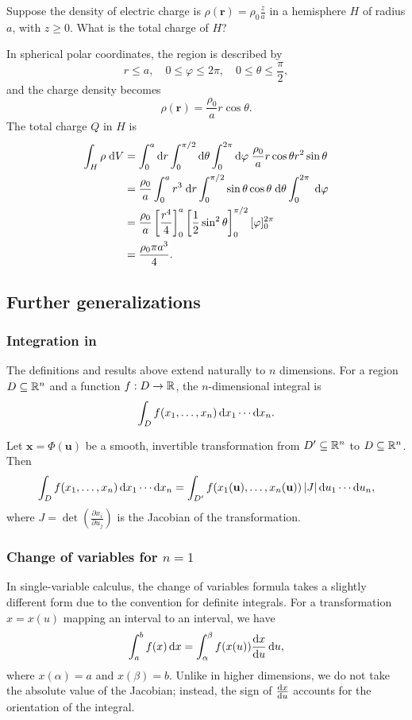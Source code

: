 \documentclass[a4paper]{article}
\begin{document}
\begin{eg}
  Suppose the density of electric charge is $\rho(\mathbf{r}) = \rho_0 \frac{z}{a}$ in a hemisphere $H$ of radius $a$, with $z \geq 0$. What is the total charge of $H$?

  In spherical polar coordinates, the region is described by
  \[
    r \leq a,\quad 0 \leq \varphi \leq 2\pi,\quad 0 \leq \theta \leq \frac{\pi}{2},
  \]
  and the charge density becomes
  \[
    \rho(\mathbf{r}) = \frac{\rho_0}{a}r\cos \theta.
  \]
  The total charge $Q$ in $H$ is
  \begin{align*}
    \int_H \rho \;\mathrm{d} V &= \int_0^a\mathrm{d} r\int_0^{\pi/2}\mathrm{d} \theta\int_0^{2\pi}\mathrm{d}\varphi\; \frac{\rho_0}{a}r\cos\theta r^2\sin\theta\\
    &= \frac{\rho_0}{a}\int_0^a r^3 \;\mathrm{d} r \int_0^{\pi/2}\sin\theta \cos\theta\;\mathrm{d} \theta \int_0^{2\pi}\;\mathrm{d} \varphi\\
    &= \frac{\rho_0}{a}\left[\frac{r^4}{4}\right]^a_0\left[\frac{1}{2}\sin^2\theta\right]^{\pi/2}_0 [\varphi]^{2\pi}_0\\
    &= \frac{\rho_0 \pi a^3}{4}.
  \end{align*}
\end{eg}

\subsection{Further generalizations}
\subsubsection*{Integration in }
The definitions and results above extend naturally to $n$ dimensions. For a region $D \subseteq \mathbb{R}^n$ and a function $f: D \to \mathbb{R}$, the $n$-dimensional integral is
\[
  \int_D f(x_1, \ldots, x_n) \, \mathrm{d} x_1 \cdots \mathrm{d} x_n.
\]

\begin{thm}
  Let $\mathbf{x} = \Phi(\mathbf{u})$ be a smooth, invertible transformation from $D' \subseteq \mathbb{R}^n$ to $D \subseteq \mathbb{R}^n$. Then
  \[
    \int_D f(x_1, \ldots, x_n) \, \mathrm{d} x_1 \cdots \mathrm{d} x_n = \int_{D'} f(x_1(\mathbf{u}), \ldots, x_n(\mathbf{u})) \, |J| \, \mathrm{d} u_1 \cdots \mathrm{d} u_n,
  \]
  where $J = \det\left( \frac{\partial x_i}{\partial u_j} \right)$ is the Jacobian of the transformation.
\end{thm}

\subsubsection*{Change of variables for \texorpdfstring{$n = 1$}{n = 1}}
In single-variable calculus, the change of variables formula takes a slightly different form due to the convention for definite integrals. For a transformation $x = x(u)$ mapping an interval to an interval, we have
\[
  \int_a^b f(x) \, \mathrm{d} x = \int_\alpha^\beta f(x(u)) \frac{\mathrm{d} x}{\mathrm{d} u} \, \mathrm{d} u,
\]
where $x(\alpha) = a$ and $x(\beta) = b$. Unlike in higher dimensions, we do not take the absolute value of the Jacobian; instead, the sign of $\frac{\mathrm{d} x}{\mathrm{d} u}$ accounts for the orientation of the integral.
\end{document}
